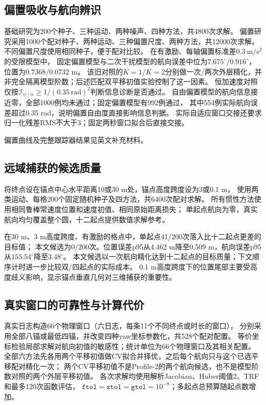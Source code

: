 \documentclass[11pt,a4paper]{ctexart}
\begin{document}
\subsection{偏置吸收与航向辨识}
基础研究为200个种子、三种运动、两种噪声、四种方法，共4800次求解。
偏置研究采用1000个配对种子、两种运动、三种偏置尺度、两种方法，共12000次求解。
不同偏置尺度使用相同种子，便于配对比较。
在有激励、每轴偏置标准差$0.3\ \mathrm{m/s^2}$的受限模型中，
固定偏置模型与二次干扰模型的航向误差中位为$7.675^\circ/0.916^\circ$，位置为$0.7368/0.0732$ m。
该旧对照的$K=1/K=2$分别做一次/两次外层精化，并非完全隔离模型阶数；后述匹配双平移初值实验控制了这一因素。
恒加速度对照仅按$\mathcal I_{\psi\mid n}\ge1/(0.35\,\mathrm{rad})^2$判断信息诊断是否通过。
自由偏置模型的航向信息接近零，全部1000例均未通过；固定偏置模型有992例通过，
其中554例实际航向误差超过0.35 rad，说明偏置自由度直接影响信息判据。
实际自适应窗口交接还要求归一化残差RMS不大于3；固定两秒窗口拟合后直接交接。

偏置曲线及完整跟踪器结果见英文补充材料。
\subsection{远域捕获的候选质量}
将终点设在锚点中心水平距离10或30 m处，锚点高度跨度设为3或0.1 m，
使用两类运动、每格200个固定随机种子及四方法，共6400次配对求解。
所有惯性方法使用相同鲁棒常速度位置和速度初值、相同原始距离损失；
单起点航向为零，真实航向均匀覆盖整个圆，十二起点提供数值求解参考。

在30 m、3 m高度跨度、有激励的格点中，单起点41/200次落入比十二起点更差的目标值；
本文候选为0/200次。位置误差p95从4.462 m降至0.509 m，航向误差p95从$155.54^\circ$降至$3.48^\circ$。
本文候选以一次航向精化达到十二起点的目标质量；下文顺序计时进一步比较双/四起点的实际成本。
0.1 m高度跨度下的位置尾部主要受高度歧义影响，显示锚点垂直几何对三维捕获的重要性。

\subsection{真实窗口的可靠性与计算代价}
真实日志构造66个物理窗口（六日志，每条11个不同终点或时长的窗口），
分别采用全部八锚或最低四锚，并改变四种yaw坐标参数化，共528个配对配置。
等价坐标检验局部求解对航向初值的敏感性；统计单位为66个物理窗口及其相关配置。
全部六方法先各用两个平移初值做CV拟合并择优，之后每个航向只与这个已选平移配对精化一次；
两个CV平移初值不是Profile-2的两个航向候选，也不是模型阶数对照的两个外层平移初值。
各次求解均使用解析Jacobian、Huber阈值2、TRF和最多120次函数评估，
$\texttt{ftol}=\texttt{xtol}=\texttt{gtol}=10^{-8}$；多起点总预算随起点数增加。
\end{document}
